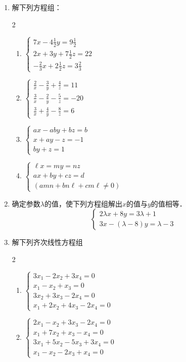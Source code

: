 \begin{enumerate}
\item 解下列方程组：
\begin{multicols}{2}
\begin{enumerate}
    \item $\begin{cases}
        7x-4\frac{1}{2}y=9\frac{1}{2}\\
        2x+3y+7\frac{1}{2}z=22\\
        -\frac{2}{3}x+2\frac{1}{2}z=3\frac{2}{3}
    \end{cases}$
    \item $\begin{cases}
        \frac{2}{x}-\frac{3}{y}+\frac{4}{z}=11\\
        \frac{3}{x}-\frac{2}{y}-\frac{5}{z}=-20\\
        \frac{3}{x}+\frac{4}{y}-\frac{8}{z}=6
    \end{cases}$
    \item $\begin{cases}
        ax-aby+bz=b\\
        x+ay-z=-1\\
        by+z=1
    \end{cases}$
    \item $\begin{cases}
        \ell x=my=nz\\
        ax+by+cz=d\\
        (amn+bn\ell+cm\ell\ne 0)
    \end{cases}$
\end{enumerate}
\end{multicols}

\item 确定参数$\lambda$的值，使下列方程组解出$x$的值与$y$的值相等．
\[\begin{cases}
    2\lambda  x+8y=3\lambda  +1 \\
    3x- (\lambda  -8) y=\lambda  -3
\end{cases}\]

\item 解下列齐次线性方程组
\begin{multicols}{2}
\begin{enumerate}
    \item $\begin{cases}
        3x_1-2x_2+3x_4=0\\
        x_1-x_2+x_3=0\\
        3x_2+3x_3-2x_4=0\\
        x_1+2x_2+4x_3-2x_4=0
    \end{cases}$
    \item $\begin{cases}
        2x_1-x_2+3x_3-2x_4=0\\
        x_1+7x_2+x_3-x_4=0\\
        3x_1+5x_2-5x_3+3x_4=0\\
        x_1-x_2-2x_3+x_4=0
    \end{cases}$
\end{enumerate}
\end{multicols}


\end{enumerate}
